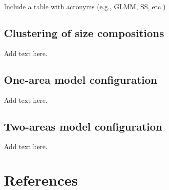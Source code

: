 \documentclass[
]{scrartcl}
\begin{document}
Include a table with acronyms (e.g., GLMM, SS, etc.)

\newpage{}

\subsection{Clustering of size
compositions}\label{clustering-of-size-compositions}

Add text here.

\newpage{}

\subsection{One-area model
configuration}\label{one-area-model-configuration}

Add text here.

\newpage{}

\subsection{Two-areas model
configuration}\label{two-areas-model-configuration}

Add text here.

\newpage{}

\section*{References}\label{references}
\end{document}

